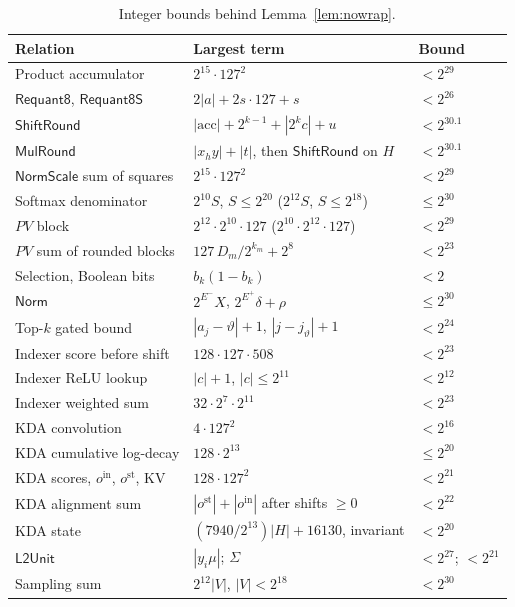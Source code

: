 \documentclass[11pt]{article}
\begin{document}
\begin{table}[h]
\centering\small
\begin{tabular}{@{}lll@{}}
\toprule
Relation & Largest term & Bound \\
\midrule
Product accumulator & \(2^{15} \cdot 127^2\) & \(< 2^{29}\) \\
\(\mathsf{Requant8}\), \(\mathsf{Requant8S}\) & \(2|a| + 2s\cdot 127 + s\) & \(< 2^{26}\) \\
\(\mathsf{ShiftRound}\) & \(|\mathrm{acc}| + 2^{k-1} + |2^k c| + u\) & \(< 2^{30.1}\) \\
\(\mathsf{MulRound}\) & \(|x_h y| + |t|\), then \(\mathsf{ShiftRound}\) on \(H\) & \(< 2^{30.1}\) \\
\(\mathsf{NormScale}\) sum of squares & \(2^{15}\cdot 127^2\) & \(< 2^{29}\) \\
Softmax denominator & \(2^{10} S\), \(S \le 2^{20}\) (\(2^{12} S\), \(S \le 2^{18}\)) & \(\le 2^{30}\) \\
\(PV\) block & \(2^{12}\cdot 2^{10}\cdot 127\) (\(2^{10}\cdot 2^{12}\cdot 127\)) & \(< 2^{29}\) \\
\(PV\) sum of rounded blocks & \(127\, D_m / 2^{k_m} + 2^8\) & \(< 2^{23}\) \\
Selection, Boolean bits & \(b_k(1 - b_k)\) & \(< 2\) \\
\(\mathsf{Norm}\) & \(2^{E^-} X\), \(2^{E^+}\delta + \rho\) & \(\le 2^{30}\) \\
Top-\(k\) gated bound & \(|a_j - \vartheta| + 1\), \(|j - j_\vartheta| + 1\) & \(< 2^{24}\) \\
Indexer score before shift & \(128 \cdot 127 \cdot 508\) & \(< 2^{23}\) \\
Indexer ReLU lookup & \(|c| + 1\), \(|c| \le 2^{11}\) & \(< 2^{12}\) \\
Indexer weighted sum & \(32 \cdot 2^7 \cdot 2^{11}\) & \(< 2^{23}\) \\
KDA convolution & \(4 \cdot 127^2\) & \(< 2^{16}\) \\
KDA cumulative log-decay & \(128 \cdot 2^{13}\) & \(\le 2^{20}\) \\
KDA scores, \(o^{\mathrm{in}}\), \(o^{\mathrm{st}}\), \(\mathrm{KV}\) & \(128 \cdot 127^2\) & \(< 2^{21}\) \\
KDA alignment sum & \(|o^{\mathrm{st}}| + |o^{\mathrm{in}}|\) after shifts \(\ge 0\) & \(< 2^{22}\) \\
KDA state & \((7940/2^{13})|H| + 16130\), invariant & \(< 2^{20}\) \\
\(\mathsf{L2Unit}\) & \(|y_i \mu|\); \(\Sigma\) & \(< 2^{27}\); \(< 2^{21}\) \\
Sampling sum & \(2^{12}|V|\), \(|V| < 2^{18}\) & \(< 2^{30}\) \\
\bottomrule
\end{tabular}
\caption{Integer bounds behind Lemma~\ref{lem:nowrap}.}
\label{tab:bounds}
\end{table}
\end{document}
